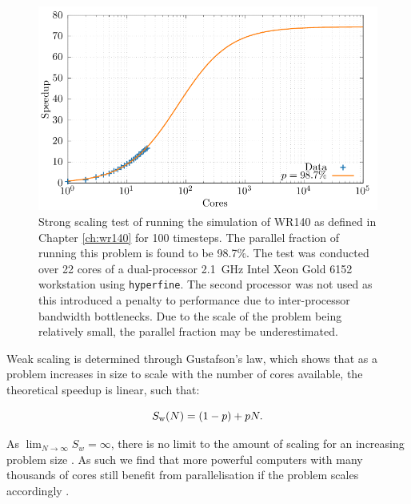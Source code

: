 \begin{figure}
  \centering
  \includegraphics{assets/athena-amdahl/amdahl.pdf}
  \caption[Strong scaling test of \athena]{Strong scaling test of \athena{} running the simulation of WR140 as defined in Chapter \ref{ch:wr140} for 100 timesteps. The parallel fraction of \athena{} running this problem is found to be 98.7\%. The test was conducted over 22 cores of a dual-processor \SI{2.1}{\giga\hertz} Intel Xeon Gold 6152 workstation using \texttt{hyperfine}. The second processor was not used as this introduced a penalty to performance due to inter-processor bandwidth bottlenecks. Due to the scale of the problem being relatively small, the parallel fraction may be underestimated.}
  \label{fig:amdahl-athena}
\end{figure}

Weak scaling is determined through Gustafson's law, which shows that as a problem increases in size to scale with the number of cores available, the theoretical speedup is linear, such that:

\begin{equation}
  S_\text{w}(N) = (1-p) + pN.
\end{equation}

\noindent
As $\lim_{N\rightarrow\infty} S_w = \infty$, there is no limit to the amount of scaling for an increasing problem size \parencite{gustafsonReevaluatingAmdahlLaw1988}.
As such we find that more powerful computers with many thousands of cores still benefit from parallelisation if the problem scales accordingly \parencite[Ch.~2]{pachecoIntroductionParallelProgramming2022}.

